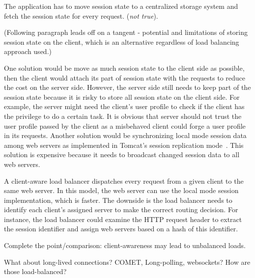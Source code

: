 The application has to move session state to a centralized
storage system and fetch the session state for every request. (\emph{not true}).

(Following paragraph leads off on a tangent - potential and limitations of
storing session state on the client, which is an alternative regardless of
load balancing approach used.)

One solution would be move as much session state to the client side as possible,
then the client would attach its part of session state
with the requests to reduce the cost on the server side.
However, the server side still needs to keep part of the session state
because it is risky to store all session state on
the client side.
For example,
the server might need the client's user profile to check if the client has
the privilege to do a certain task.
It is obvious that server should not trust the user profile passed by the client
as a misbehaved client could forge a user profile in its requests.
%
%
Another solution would be synchronizing local mode session data among web servers
as implemented in Tomcat's session replication mode~\cite{tomcatcluster}. %
This solution is expensive because it needs to broadcast
changed session data to all web servers.


A client-aware load balancer dispatches every request from a given
client to the same web server.
In this model, the web server can use the local mode session implementation,
which is faster.
The downside is the load balancer needs to identify each client's assigned
server to make the correct routing decision.
For instance, the load balancer could examine the
HTTP request header to extract the session identifier
and assign web servers based on a hash of this identifier.


Complete the point/comparison: client-awareness may lead to unbalanced loads.

What about long-lived connections? COMET, Long-polling, websockets?
How are those load-balanced?


